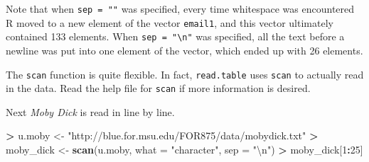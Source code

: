 \documentclass[]{krantz}
\makeatletter
\newenvironment{Shaded}{\begin{snugshade}}{\end{snugshade}}
\newcommand{\KeywordTok}[1]{\textcolor[rgb]{0.27,0.27,0.27}{\textbf{#1}}}
\newcommand{\DataTypeTok}[1]{\textcolor[rgb]{0.27,0.27,0.27}{#1}}
\newcommand{\DecValTok}[1]{\textcolor[rgb]{0.06,0.06,0.06}{#1}}
\newcommand{\CharTok}[1]{\textcolor[rgb]{0.5,0.5,0.5}{#1}}
\newcommand{\StringTok}[1]{\textcolor[rgb]{0.5,0.5,0.5}{#1}}
\newcommand{\OperatorTok}[1]{\textcolor[rgb]{0.43,0.43,0.43}{\textbf{#1}}}
\newcommand{\NormalTok}[1]{#1}
\newenvironment{kframe}{%
\medskip{}
\setlength{\fboxsep}{.8em}
 \def\at@end@of@kframe{}%
 \ifinner\ifhmode%
  \def\at@end@of@kframe{\end{minipage}}%
  \begin{minipage}{\columnwidth}%
 \fi\fi%
 \def\FrameCommand##1{\hskip\@totalleftmargin \hskip-\fboxsep
 \colorbox{shadecolor}{##1}\hskip-\fboxsep
     \hskip-\linewidth \hskip-\@totalleftmargin \hskip\columnwidth}%
 \MakeFramed {\advance\hsize-\width
   \@totalleftmargin\z@ \linewidth\hsize
   \@setminipage}}%
 {\par\unskip\endMakeFramed%
 \at@end@of@kframe}
\renewenvironment{Shaded}{\begin{kframe}}{\end{kframe}}
\makeatother
\begin{document}
Note that when \texttt{sep\ =\ ""} was specified, every time whitespace
was encountered R moved to a new element of the vector \texttt{email1},
and this vector ultimately contained 133 elements. When
\texttt{sep\ =\ "\textbackslash{}n"} was specified, all the text before
a newline was put into one element of the vector, which ended up with 26
elements.

The \texttt{scan} function is quite flexible. In fact,
\texttt{read.table} uses \texttt{scan} to actually read in the data.
Read the help file for \texttt{scan} if more information is desired.

Next \emph{Moby Dick} is read in line by line.

\begin{Shaded}
\begin{Highlighting}[]
\OperatorTok{>}\StringTok{ }\NormalTok{u.moby <-}\StringTok{ "http://blue.for.msu.edu/FOR875/data/mobydick.txt"}
\OperatorTok{>}\StringTok{ }\NormalTok{moby_dick <-}\StringTok{ }\KeywordTok{scan}\NormalTok{(u.moby, }\DataTypeTok{what =} \StringTok{"character"}\NormalTok{, }\DataTypeTok{sep =} \StringTok{"}\CharTok{\textbackslash{}n}\StringTok{"}\NormalTok{)}
\OperatorTok{>}\StringTok{ }\NormalTok{moby_dick[}\DecValTok{1}\OperatorTok{:}\DecValTok{25}\NormalTok{]}
\end{Highlighting}
\end{Shaded}
\end{document}
